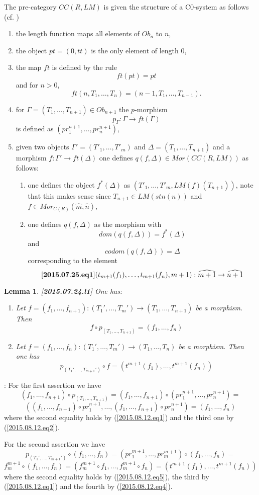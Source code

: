 \documentclass[11pt]{article}
\newenvironment{eq}{\begin{equation}}{\end{equation}}
\newenvironment{proof}{{\bf Proof}:}{\vskip 5mm }
\newtheorem{lemma}[proposition]{Lemma}
\newcommand{\llabel}[1]{\label{#1}[{\bf #1}]}
\newcommand{\sr}{\rightarrow}
\newcommand{\wh}{\widehat}
\begin{document}
The pre-category $CC(R,LM)$ is given the structure of a C0-system as follows (cf. \cite[Definition 2.1]{Csubsystems})
%
\begin{enumerate}
\item the length function maps all elements of $Ob_n$ to $n$,
\item the object $pt=(0,tt)$ is the only element of length $0$,
\item the map $ft$ is defined by the rule
%
$$ft(pt)=pt$$
%
and for $n>0$,
%
$$ft(n,T_1,\dots,T_n)=(n-1,T_1,\dots,T_{n-1}).$$
%
\item for $\Gamma=(T_1,\dots,T_{n+1})\in Ob_{n+1}$  the $p$-morphism
%
$$p_{\Gamma}:\Gamma\sr ft(\Gamma)$$
%
is defined as $(pr^{n+1}_1,\dots,pr^{n+1}_n)$,
% 
\item given two objects $\Gamma'=(T'_1,\dots,T'_m)$ and $\Delta=(T_1,\dots,T_{n+1})$ and a morphism $f:\Gamma'\sr ft(\Delta)$ one defines $q(f,\Delta)\in Mor(CC(R,LM))$ as follows:
%
\begin{enumerate}
\item one defines the object $f^*(\Delta)$ as $(T'_1,\dots,T'_m,LM(f)(T_{n+1}))$, note that this makes sense since $T_{n+1}\in LM({stn(n)})$ and $f\in Mor_{{C(R)}}(\wh{m},\wh{n})$,
\item one defines $q(f,\Delta)$ as the morphism with 
%
$$dom(q(f,\Delta))=f^*(\Delta)$$
%
and 
%
$$codom(q(f,\Delta))=\Delta$$
%
corresponding to the element 
%
\begin{eq}\llabel{2015.07.25.eq1}
(t_{m+1}(f_1),\dots,t_{m+1}(f_{n}),m+1): \wh{m+1}\sr \wh{n+1}
\end{eq}
%
\end{enumerate}
\end{enumerate}
%
\begin{lemma}
\llabel{2015.07.24.l1}
One has:
%
\begin{enumerate}
\item Let $f=(f_1,\dots,f_{n+1}):(T_1',\dots,T_m')\sr (T_1,\dots,T_{n+1})$ be a morphism. Then 
%
$$f\circ p_{(T_1,\dots,T_{n+1})}=(f_1,\dots,f_n)$$
%
\item Let $f=(f_1,\dots,f_n):(T_1',\dots,T_m')\sr (T_1,\dots,T_{n})$ be a morphism. Then one has
%
$$p_{(T_1',\dots,T_{m+1}')}\circ f=(t^{m+1}(f_1),\dots,t^{m+1}(f_n))$$
%
\end{enumerate}
\end{lemma}
%
\begin{proof}
For the first assertion we have 
%
$$(f_1,\dots,f_{n+1})\circ p_{(T_1,\dots,T_{n+1})}=(f_1,\dots,f_{n+1})\circ (pr^{n+1}_1,\dots,pr^{n+1}_n)=$$$$((f_1,\dots,f_{n+1})\circ pr^{n+1}_1,\dots, (f_1,\dots,f_{n+1})\circ pr^{n+1}_n)=(f_1,\dots,f_n)$$
%
where the second equality holds by (\ref{2015.08.12.eq1}) and the third one by (\ref{2015.08.12.eq2}).

For the second assertion we have
%
$$p_{(T_1',\dots,T_{m+1}')}\circ (f_1,\dots,f_{n})=(pr^{m+1}_1,\dots,pr^{m+1}_m)\circ (f_1,\dots,f_{n})=$$
$$f^{m+1}_m\circ (f_1,\dots,f_{n})=(f^{m+1}_m\circ f_1,\dots, f^{m+1}_m\circ f_n)=(t^{m+1}(f_1),\dots,t^{m+1}(f_n))$$
%
where the second equality holds by (\ref{2015.08.12.eq5}), the third by (\ref{2015.08.12.eq1}) and the fourth by (\ref{2015.08.12.eq4}).
\end{proof}
\end{document}

